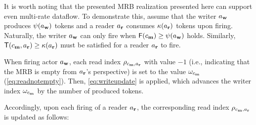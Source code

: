 \par
It is worth noting that the presented \ac{MRB} realization presented here can support even multi-rate dataflow.
To demonstrate this, assume that the writer $\Writer$ produces $\Produce(\Writer)$ tokens and a reader $\Reader$ consumes $\Consume(\Reader)$ tokens upon firing.
Naturally, the writer $\Writer$ can only fire when $\Free(\GenMRB) \ge \Produce(\Writer)$ holds.
Similarly, $\Tokens(\GenMRB,\Reader) \ge \Consume(\Reader)$ must be satisfied for a reader $\Reader$ to fire.
\par
When firing actor $\Writer$, each read index $\Read_{\GenMRB,\Reader}$ with value $-1$ (i.e., indicating that the \ac{MRB} is empty from $\Reader$'s perspective) is set to the value $\Write_{\GenMRB}$ (\cref{eq:readnotempty}).
Then, \cref{eq:writeupdate} is applied, which advances the writer index $\Write_{\GenMRB}$ by the number of produced tokens.
\vspace{-2mm}\\
\par
Accordingly, upon each firing of a reader $\Reader$, the corresponding read index $\Read_{\GenMRB,\Reader}$ is updated as follows:
